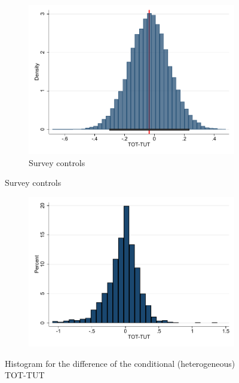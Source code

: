 \documentclass[oneside,11pt]{article}
\begin{document}
\begin{figure}[H]
\begin{center}
\begin{subfigure}{0.475\textwidth}
        \caption{Survey controls}
        \centering
        \includegraphics[width=\textwidth]{Figuras/tot_tut_btsp3.pdf}
    \end{subfigure}
  
    \end{center}
     \scriptsize    
\end{figure}





\begin{figure}[H]
     \caption{TOT-TUT Histogram}
    \label{}
    \begin{center}
    \begin{subfigure}{0.75\textwidth}
        \centering
        \includegraphics[width=\textwidth]{Figuras/dif_tot_tut.pdf}
    \end{subfigure}
    \end{center}
    \scriptsize
        Histogram for the difference of the conditional (heterogeneous) TOT-TUT
\end{figure}
\end{document}
